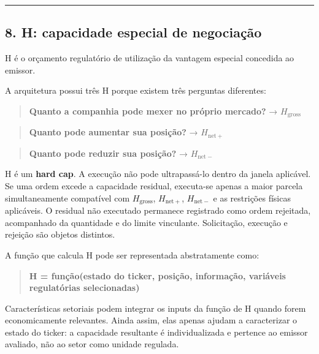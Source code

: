\documentclass[
  a4paper,
]{article}
\begin{document}
\begin{center}\rule{0.5\linewidth}{0.5pt}\end{center}

\hypertarget{8-h-capacidade-especial-de-negociacao}{}

\hypertarget{8-h-capacidade-especial-de-negociauxe7uxe3o}{%
\subsection{8. H: capacidade especial de
negociação}\label{8-h-capacidade-especial-de-negociauxe7uxe3o}}

H é o orçamento regulatório de utilização da vantagem especial concedida
ao emissor.

A arquitetura possui três H porque existem três perguntas diferentes:

\begin{quote}
\textbf{Quanto a companhia pode mexer no próprio mercado?} →
\(H_{\mathrm{gross}}\)
\end{quote}

\begin{quote}
\textbf{Quanto pode aumentar sua posição?} → \(H_{\mathrm{net}+}\)
\end{quote}

\begin{quote}
\textbf{Quanto pode reduzir sua posição?} → \(H_{\mathrm{net}-}\)
\end{quote}

H é um \textbf{hard cap}. A execução não pode ultrapassá-lo dentro da
janela aplicável. Se uma ordem excede a capacidade residual, executa-se
apenas a maior parcela simultaneamente compatível com
\(H_{\mathrm{gross}}\), \(H_{\mathrm{net}+}\), \(H_{\mathrm{net}-}\) e
as restrições físicas aplicáveis. O residual não executado permanece
registrado como ordem rejeitada, acompanhado da quantidade e do limite
vinculante. Solicitação, execução e rejeição são objetos distintos.

A função que calcula H pode ser representada abstratamente como:

\begin{quote}
\textbf{H = função(estado do ticker, posição, informação, variáveis
regulatórias selecionadas)}
\end{quote}

Características setoriais podem integrar os inputs da função de H quando
forem economicamente relevantes. Ainda assim, elas apenas ajudam a
caracterizar o estado do ticker: a capacidade resultante é
individualizada e pertence ao emissor avaliado, não ao setor como
unidade regulada.
\end{document}

